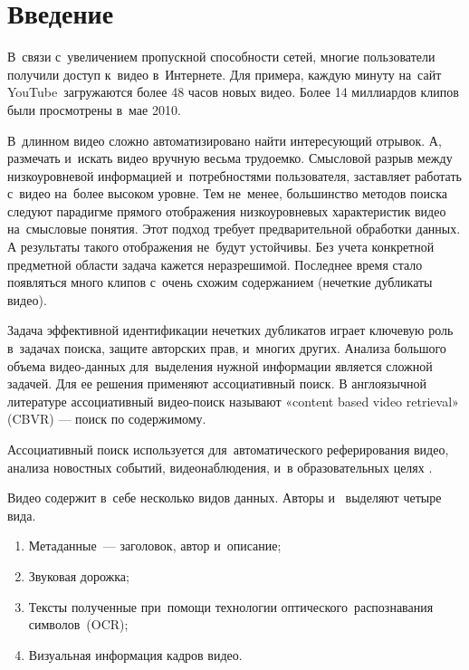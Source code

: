 %
%
%

\pagebreak


\section{Введение}

В~связи с~увеличением пропускной способности сетей,
многие пользователи получили доступ к~видео в~Интернете.
Для примера, каждую минуту на~сайт YouTube\  загружаются
более 48 часов новых видео.
Более 14 миллиардов клипов были просмотрены в~мае 2010.

В~длинном видео сложно автоматизировано найти интересующий отрывок.
А, размечать и~искать видео вручную весьма трудоемко.
Смысловой разрыв между низкоуровневой информацией
и~потребностями пользователя, заставляет работать
с~видео на~более высоком уровне.
Тем не~менее, большинство методов поиска следуют парадигме
прямого отображения низкоуровневых характеристик видео
на~смысловые понятия.
Этот подход требует предварительной обработки данных.
А результаты такого отображения не~будут устойчивы.
Без учета конкретной предметной области задача кажется неразрешимой.
Последнее время стало появляться много клипов
с~очень схожим содержанием (нечеткие дубликаты видео).

Задача эффективной идентификации нечетких дубликатов играет ключевую
роль в~задачах поиска, защите авторских прав, и~многих других.
Анализа большого объема видео-данных для~выделения нужной
информации является сложной задачей.
Для ее решения применяют ассоциативный поиск.
В англоязычной литературе ассоциативный видео-поиск называют
«content based video retrieval» (CBVR) —
поиск по содержимому.

Ассоциативный поиск используется для~автоматического
реферирования видео, анализа новостных событий,
видеонаблюдения, и~в образовательных целях \cite{Dimitrova:2002}.

Видео содержит в~себе несколько видов данных.
Авторы \cite{Chung:2007:PAU} и~\cite{smeaton:2006} выделяют четыре вида.
\begin{enumerate}
    \item Метаданные~— заголовок, автор и~описание;
    \item Звуковая дорожка;
    \item Тексты полученные при~помощи технологии
          оптического\
          распознавания символов\
          (OCR);
    \item Визуальная информация кадров видео.
\end{enumerate}



